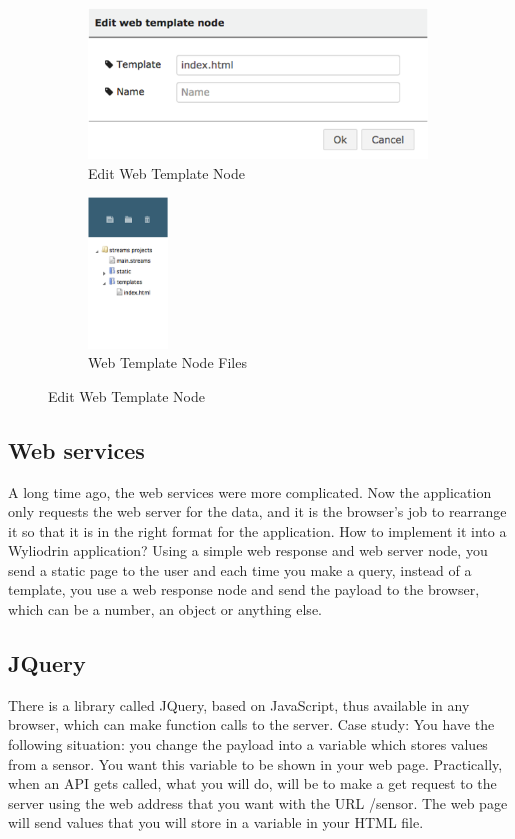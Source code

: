 \begin{figure}[ht]

\begin{subfigure}{0.5\textwidth}
    \includegraphics[width=0.9\linewidth, height=4cm]{figures/Edit Web Template Node.png}
    \caption{Edit Web Template Node}
\end{subfigure}
\begin{subfigure}{0.4\textwidth}
    \includegraphics[width=0.9\linewidth, height=4cm]{figures/Edit Web Template Node Files.png}
    \caption{Web Template Node Files}
\end{subfigure}

\caption{Edit Web Template Node}
\end{figure}

\subsection{Web services}
A long time ago, the web services were more complicated. Now the application only requests the web server for the data, and it is the browser's job to rearrange it so that it is in the right format for the application.  
How to implement it into a Wyliodrin application? Using a simple web response and web server node, you send a static page to the user and each time you make a query, instead of a template, you use a web response node and send the payload to the browser, which can be a number, an object or anything else. 

\subsection{JQuery}
There is a library called JQuery, based on JavaScript, thus available in any browser, which can make function calls to the server.  
Case study: You have the following situation: you change the payload into a variable which stores values from a sensor. You want this variable to be shown in your web page. Practically, when an API gets called, what you will do, will be to make a get request to the server using the web address that you want with the URL /sensor. The web page will send values that you will store in a variable in your HTML file.  

